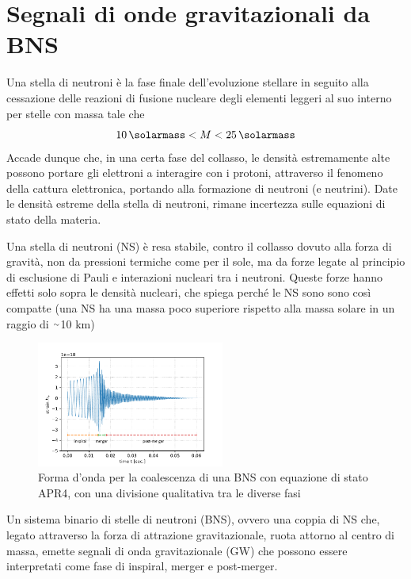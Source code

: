 \chapter[Segnali di GW da BNS]{Segnali di onde gravitazionali da BNS}
\label{chapter:segnaleGWdaBNS}
Una stella di neutroni è la fase finale dell'evoluzione stellare in seguito alla cessazione delle reazioni di fusione nucleare degli elementi leggeri al suo interno
per stelle con massa tale che
\begin{equation}
   	\SI{10}{\solarmass} < M < \SI{25}{\solarmass}
   	\label{eqn:massNS}
\end{equation}
Accade dunque che, in una certa fase del collasso, le densità estremamente alte possono portare gli elettroni a interagire con i protoni, attraverso il fenomeno della cattura elettronica, portando alla formazione di neutroni (e neutrini). Date le densità estreme della stella di neutroni, rimane incertezza sulle equazioni di stato della materia.\cite{hobson2006general}

Una stella di neutroni (NS) è resa stabile, contro il collasso dovuto alla forza di gravità, non da pressioni termiche come per il sole, ma da forze legate al principio di esclusione di Pauli e interazioni nucleari tra i neutroni. Queste forze hanno effetti solo sopra le densità nucleari, che spiega perché le NS sono sono così compatte (una NS ha una massa poco superiore rispetto alla massa solare in un raggio di $\smallsim$10 km)\cite{hartle2003gravity}

\begin{figure}
	\vspace{-15pt}
	\begin{center}
		\includegraphics[width=0.55\textwidth]{figures/Capitolo_1/APR4.pdf}
	\end{center}
	\vspace{-10pt}
	\caption{Forma d'onda per la coalescenza di una BNS con equazione di stato APR4, con una divisione qualitativa tra le diverse fasi}
	\label{fig:forma_onda_APR4}
	\vspace{-10pt}
\end{figure}
Un sistema binario di stelle di neutroni (BNS), ovvero una coppia di NS che, legato attraverso la forza di attrazione gravitazionale, ruota attorno al centro di massa, emette segnali di onda gravitazionale (GW) che possono essere interpretati come fase di inspiral, merger e post-merger.

